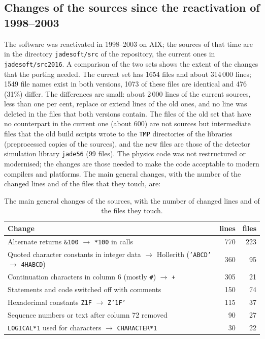 \subsection{Changes of the sources since the reactivation of 1998--2003}
\label{sec:srcchanges}
The software was reactivated in 1998--2003 on AIX; the sources of that time are in the directory \texttt{jadesoft/\allowbreak{}src} of the repository, the current ones in \texttt{jadesoft/\allowbreak{}src2016}. A comparison of the two sets shows the extent of the changes that the porting needed. The current set has 1654 files
and about 314\,000 lines; 1549 file names exist in both versions, 1073 of these files are identical and 476 (31\%) differ. The
differences are small: about 2\,000 lines of the current sources, less than one per cent, replace or extend lines of the old ones,
and no line was deleted in the files that both versions contain. The files of the old set that have no counterpart in the current one
(about 600) are not sources but intermediate files that the old build scripts wrote to the \texttt{TMP} directories of the libraries
(preprocessed copies of the sources), and the new files are those of the detector simulation library \texttt{jade56} (99 files). The physics code was not restructured or modernised;
the changes are those needed to make the code acceptable to modern compilers and platforms. The main general
changes, with the number of the changed lines and of the files that they touch, are:
\begin{table}[H]\centering
\begin{tabular}{|p{}|r|r|}\hline
Change & lines & files \\\hline\hline
Alternate returns \texttt{\&100} $\to$ \texttt{*100} in calls & 770 & 223 \\
Quoted character constants in integer data $\to$ Hollerith (\texttt{'ABCD'} $\to$ \texttt{4HABCD}) & 360 & 95 \\
Continuation characters in column 6 (mostly \texttt{\#}) $\to$ \texttt{+} & 305 & 21 \\
Statements and code switched off with comments & 150 & 74 \\
Hexadecimal constants \texttt{Z1F} $\to$ \texttt{Z'1F'} & 115 & 37 \\
Sequence numbers or text after column 72 removed & 90 & 27 \\
\texttt{LOGICAL*1} used for characters $\to$ \texttt{CHARACTER*1} & 30 & 22 \\\hline
\end{tabular}
\caption{The main general changes of the sources, with the number of changed lines and of the files they touch.}
\label{tab:srcchanges}
\end{table}
